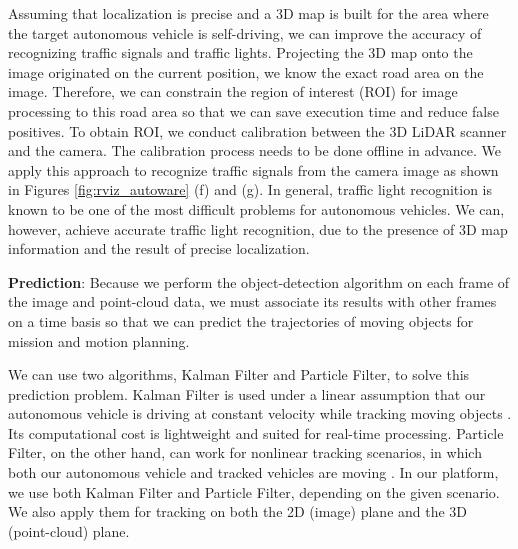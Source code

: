 Assuming that localization is precise and a 3D map is built for the area
where the target autonomous vehicle is self-driving, we can improve the
accuracy of recognizing traffic signals and traffic lights.
Projecting the 3D map onto the image originated on the current position,
we know the exact road area on the image.
Therefore, we can constrain the region of interest (ROI) for image
processing to this road area so that we can save execution time and
reduce false positives.
To obtain ROI, we conduct calibration between the 3D LiDAR scanner and
the camera.
The calibration process needs to be done offline in advance.
We apply this approach to recognize traffic signals from the camera image as shown in Figures \ref{fig:rviz_autoware} (f) and (g).
In general, traffic light recognition is known to be one of the most
difficult problems for autonomous vehicles.
We can, however, achieve accurate traffic light recognition,
due to the presence of 3D map information and the result of precise
localization.



\textbf{Prediction}:
Because we perform the object-detection algorithm on each frame of the image and point-cloud data, we must associate its results with other frames on a time basis so that we can predict the trajectories of moving objects for mission and motion planning.

We can use two algorithms, Kalman Filter and Particle Filter, to solve this prediction problem.
Kalman Filter is used under a linear assumption that our autonomous vehicle is driving at constant velocity while tracking moving objects \cite{kalman1960new}.
Its computational cost is lightweight and suited for real-time processing.
Particle Filter, on the other hand, can work for nonlinear tracking scenarios, in which both our autonomous vehicle and tracked vehicles are moving \cite{arulampalam2002tutorial}.
In our platform, we use both Kalman Filter and Particle Filter, depending on the given scenario.
We also apply them for tracking on both the 2D (image) plane and the 3D (point-cloud) plane.


